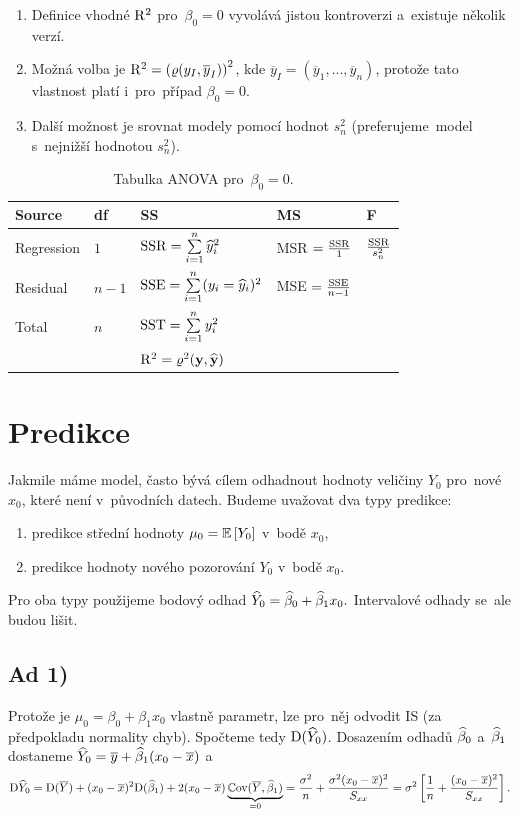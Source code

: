 \begin{enumerate}[1.]
  \item Definice vhodné $\mathrm{R}^2$ pro~$\beta_0 = 0$ vyvolává jistou kontroverzi a~existuje několik verzí.
  \item Možná volba je $\mathrm{R}^2 = \left(\varrho (y_I, \overline{y}_I)\right)^2$, kde $\overline{y}_I = (\overline{y}_1,...,\overline{y}_n)$, protože tato vlastnost platí i~pro~případ $\beta_0 = 0$.
  \item Další možnost je srovnat modely pomocí hodnot $s_n^2$ (preferujeme~model s~nejnižší hodnotou $s_n^2$).
\end{enumerate}\begin{table}[h]
	\begin{tabular}{lllll}
		Source & df & SS & MS & F \\
		\hline
		Regression & $1$ & $\mathrm{SSR} = \sum\limits_{i=1}^{n} \widehat{y}_i^2$ & MSR $ = \frac{\mathrm{SSR}}{1}$ & $\frac{\mathrm{SSR}}{s_n^2}$ \\
		Residual & $n-1$ & $\mathrm{SSE} = \sum\limits_{i=1}^{n} (y_i = \widehat{y}_i)^2$ & MSE $ = \frac{\mathrm{SSE}}{n-1}$ &  \\
		Total & $n$ & $\mathrm{SST} = \sum\limits_{i=1}^{n} y_i^2$ &  &  \\
		\hline
		&  & $\mathrm{R}^2 = \varrho^2(\textbf{y},\widehat{\textbf{y}})$ &  &  \\
	\end{tabular}
\caption{Tabulka ANOVA pro~$\beta_0 = 0$.}
\end{table}

\section{Predikce}
Jakmile máme model, často bývá cílem odhadnout hodnoty veličiny $Y_0$ pro~nové $x_0$, které není v~původních datech. Budeme uvažovat dva typy predikce:\begin{enumerate}[1)]
	\item predikce střední hodnoty $\mu_0 = \mathbb{E}\left[ Y_0 \right]$ v~bodě $x_0$,
	\item predikce hodnoty nového pozorování $Y_0$ v~bodě $x_0$.
\end{enumerate}
Pro oba typy použijeme bodový odhad
 $ \widehat{Y}_0 = \widehat{\beta}_0+\widehat{\beta}_1 x_0. $
Intervalové odhady se~ale budou lišit.

\subsection*{Ad 1)}
	Protože je $\mu_0 = \beta_0+\beta_1 x_0$ vlastně parametr, lze pro~něj odvodit IS (za předpokladu normality chyb).
	Spočteme tedy $\mathrm{D}(\widehat{Y}_0)$. Dosazením odhadů $\widehat{\beta}_0$ a~$\widehat{\beta}_1$ dostaneme $\widehat{Y}_0 = \overline{y}+\widehat{\beta}_1(x_0-\overline{x})$ a
	 $$ \mathrm{D}\widehat{Y}_0 = \mathrm{D}(\overline{Y})+(x_0-\overline{x})^2\mathrm{D}(\widehat{\beta}_1)+2(x_0-\overline{x})\underbrace{\mathbb{C}\mathrm{ov}(\overline{Y},\widehat{\beta}_1)}_{ = 0} = \frac{\sigma^2}{n}+\frac{\sigma^2(x_0-\overline{x})^2}{S_{xx}} = \sigma^2\left[\frac{1}{n}+\frac{(x_0-\overline{x})^2}{S_{xx}} \right]. $$
	

